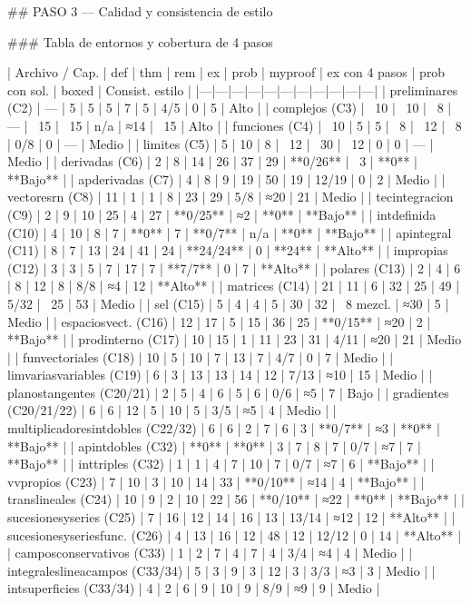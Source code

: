 ## PASO 3 — Calidad y consistencia de estilo

### Tabla de entornos y cobertura de 4 pasos

| Archivo / Cap. | def | thm | rem | ex | prob | myproof | ex con 4 pasos | prob con sol. | boxed | Consist. estilo |
|---|---|---|---|---|---|---|---|---|---|---|
| preliminares (C2) | — | 5 | 5 | 5 | 7 | 5 | 4/5 | 0 | 5 | Alto |
| complejos (C3) | ~10 | ~10 | ~8 | — | ~15 | ~15 | n/a | ≈14 | ~15 | Alto |
| funciones (C4) | ~10 | 5 | 5 | ~8 | ~12 | ~8 | 0/8 | 0 | — | Medio |
| limites (C5) | 5 | 10 | 8 | ~12 | ~30 | ~12 | 0 | 0 | — | Medio |
| derivadas (C6) | 2 | 8 | 14 | 26 | 37 | 29 | **0/26** | ~3 | **0** | **Bajo** |
| apderivadas (C7) | 4 | 8 | 9 | 19 | 50 | 19 | 12/19 | 0 | 2 | Medio |
| vectoresrn (C8) | 11 | 1 | 1 | 8 | 23 | 29 | 5/8 | ≈20 | 21 | Medio |
| tecintegracion (C9) | 2 | 9 | 10 | 25 | 4 | 27 | **0/25** | ≈2 | **0** | **Bajo** |
| intdefinida (C10) | 4 | 10 | 8 | 7 | **0** | 7 | **0/7** | n/a | **0** | **Bajo** |
| apintegral (C11) | 8 | 7 | 13 | 24 | 41 | 24 | **24/24** | 0 | **24** | **Alto** |
| impropias (C12) | 3 | 3 | 5 | 7 | 17 | 7 | **7/7** | 0 | 7 | **Alto** |
| polares (C13) | 2 | 4 | 6 | 8 | 12 | 8 | 8/8 | ≈4 | 12 | **Alto** |
| matrices (C14) | 21 | 11 | 6 | 32 | 25 | 49 | 5/32 | ~25 | 53 | Medio |
| sel (C15) | 5 | 4 | 4 | 5 | 30 | 32 | ~8 mezcl. | ≈30 | 5 | Medio |
| espaciosvect. (C16) | 12 | 17 | 5 | 15 | 36 | 25 | **0/15** | ≈20 | 2 | **Bajo** |
| prodinterno (C17) | 10 | 15 | 1 | 11 | 23 | 31 | 4/11 | ≈20 | 21 | Medio |
| funvectoriales (C18) | 10 | 5 | 10 | 7 | 13 | 7 | 4/7 | 0 | 7 | Medio |
| limvariasvariables (C19) | 6 | 3 | 13 | 13 | 14 | 12 | 7/13 | ≈10 | 15 | Medio |
| planostangentes (C20/21) | 2 | 5 | 4 | 6 | 5 | 6 | 0/6 | ≈5 | 7 | Bajo |
| gradientes (C20/21/22) | 6 | 6 | 12 | 5 | 10 | 5 | 3/5 | ≈5 | 4 | Medio |
| multiplicadoresintdobles (C22/32) | 6 | 6 | 2 | 7 | 6 | 3 | **0/7** | ≈3 | **0** | **Bajo** |
| apintdobles (C32) | **0** | **0** | 3 | 7 | 8 | 7 | 0/7 | ≈7 | 7 | **Bajo** |
| inttriples (C32) | 1 | 1 | 4 | 7 | 10 | 7 | 0/7 | ≈7 | 6 | **Bajo** |
| vvpropios (C23) | 7 | 10 | 3 | 10 | 14 | 33 | **0/10** | ≈14 | 4 | **Bajo** |
| translineales (C24) | 10 | 9 | 2 | 10 | 22 | 56 | **0/10** | ≈22 | **0** | **Bajo** |
| sucesionesyseries (C25) | 7 | 16 | 12 | 14 | 16 | 13 | 13/14 | ≈12 | 12 | **Alto** |
| sucesionesyseriesfunc. (C26) | 4 | 13 | 16 | 12 | 48 | 12 | 12/12 | 0 | 14 | **Alto** |
| camposconservativos (C33) | 1 | 2 | 7 | 4 | 7 | 4 | 3/4 | ≈4 | 4 | Medio |
| integraleslineacampos (C33/34) | 5 | 3 | 9 | 3 | 12 | 3 | 3/3 | ≈3 | 3 | Medio |
| intsuperficies (C33/34) | 4 | 2 | 6 | 9 | 10 | 9 | 8/9 | ≈9 | 9 | Medio |


